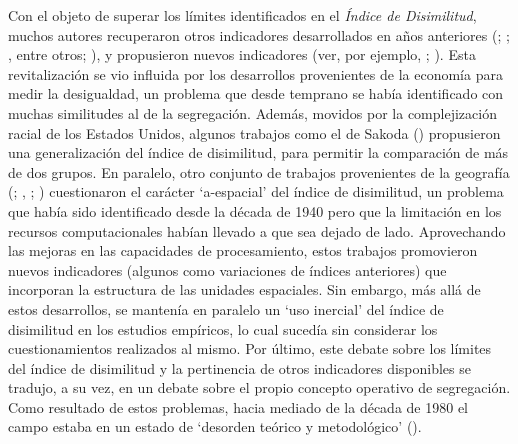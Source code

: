 \documentclass[
  spanish,
  a4paper,%
  chapterprefix=true,%
  DIV=calc,%
  twoside]{scrbook}%
\begin{document}
Con el objeto de superar los límites identificados en el \emph{Índice de
Disimilitud}, muchos autores recuperaron otros indicadores desarrollados
en años anteriores (; ; ,
entre otros; ), y propusieron nuevos indicadores (ver, por ejemplo, ; ). Esta revitalización se vio influida por los
desarrollos provenientes de la economía para medir la desigualdad, un
problema que desde temprano se había identificado con muchas similitudes
al de la segregación. Además, movidos por la complejización racial de
los Estados Unidos, algunos trabajos como el de Sakoda () propusieron
una generalización del índice de disimilitud, para permitir la
comparación de más de dos grupos. En paralelo, otro conjunto de trabajos
provenientes de la geografía (; , ; ) cuestionaron el carácter `a-espacial' del índice de
disimilitud, un problema que había sido identificado desde la década de
1940 pero que la limitación en los recursos computacionales habían
llevado a que sea dejado de lado. Aprovechando las mejoras en las
capacidades de procesamiento, estos trabajos promovieron nuevos
indicadores (algunos como variaciones de índices anteriores) que
incorporan la estructura de las unidades espaciales. Sin embargo, más
allá de estos desarrollos, se mantenía en paralelo un `uso inercial' del
índice de disimilitud en los estudios empíricos, lo cual sucedía sin
considerar los cuestionamientos realizados al mismo. Por último, este
debate sobre los límites del índice de disimilitud y la pertinencia de
otros indicadores disponibles se tradujo, a su vez, en un debate sobre
el propio concepto operativo de segregación. Como resultado de estos
problemas, hacia mediado de la década de 1980 el campo estaba en un
estado de `desorden teórico y metodológico' ().
\end{document}
